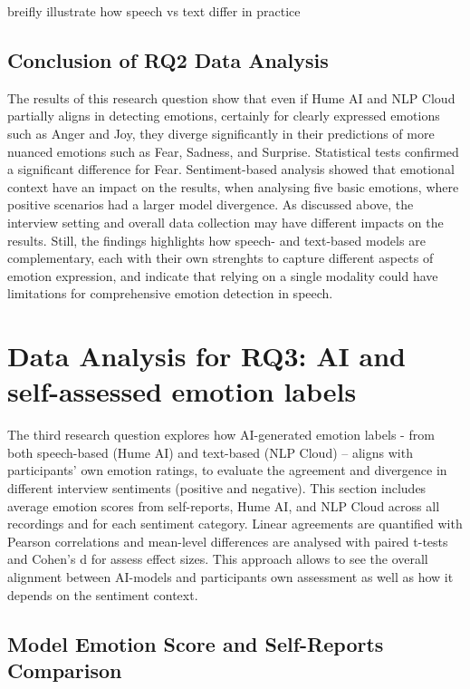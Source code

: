 breifly illustrate how speech vs text differ in practice 

\subsection{Conclusion of RQ2 Data Analysis}
The results of this research question show that even if Hume AI and NLP Cloud partially aligns in detecting emotions, certainly for clearly expressed emotions such as Anger and Joy, 
they diverge significantly in their predictions of more nuanced emotions such as Fear, Sadness, and Surprise. Statistical tests confirmed a significant difference for Fear. 
Sentiment-based analysis showed that emotional context have an impact on the results, when analysing five basic emotions, where positive scenarios had a larger model divergence. 
As discussed above, the interview setting and overall data collection may have different impacts on the results. Still, the findings highlights how speech- and text-based models are complementary, each 
with their own strenghts to capture different aspects of emotion expression, and indicate that relying on a single modality could have limitations for comprehensive emotion detection in speech.  


\section{Data Analysis for RQ3: AI and self-assessed emotion labels}

The third research question explores how AI-generated emotion labels - from both speech-based (Hume AI) and text-based (NLP Cloud) – aligns with participants’ own emotion ratings, to evaluate the agreement and divergence in different interview sentiments (positive and negative). This section includes average emotion scores from self-reports, Hume AI, and NLP Cloud across all recordings and for each sentiment category. Linear agreements are quantified with Pearson correlations and mean-level differences are analysed with paired t-tests and Cohen’s d for assess effect sizes. This approach allows to see the overall alignment between AI-models and participants own assessment as well as how it depends on the sentiment context. 
\subsection{Model Emotion Score and Self-Reports Comparison}

